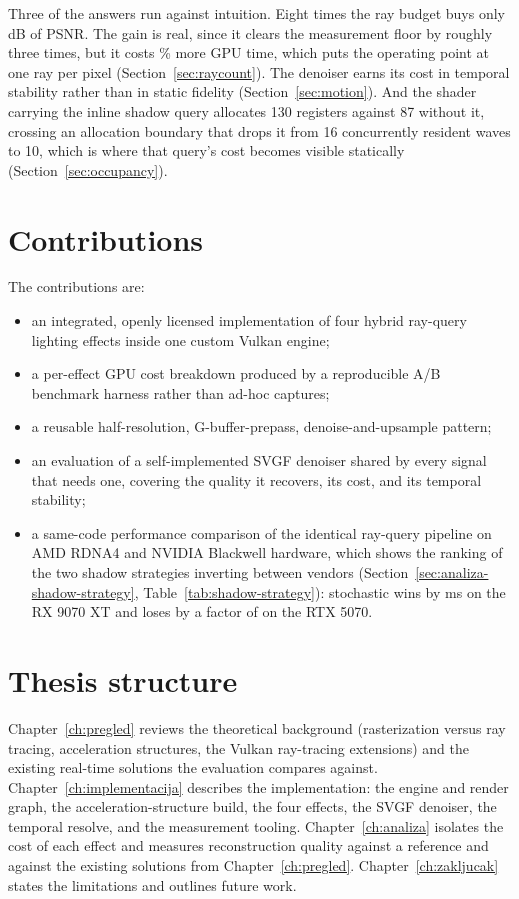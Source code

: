 Three of the answers run against intuition. Eight times the ray budget buys only \rcPsnrGain{} dB of
PSNR. The gain is real, since it clears the measurement floor by roughly three times, but it costs
\rcGpuPct\% more GPU time, which puts the operating point at one ray per pixel
(Section~\ref{sec:raycount}). The denoiser earns its cost in temporal stability rather than in static
fidelity (Section~\ref{sec:motion}). And the shader carrying the inline shadow query allocates 130
registers against 87 without it, crossing an allocation boundary that drops it from 16 concurrently
resident waves to 10, which is where that query's cost becomes visible statically
(Section~\ref{sec:occupancy}).

\section{Contributions}

The contributions are:

\begin{itemize}
\item an integrated, openly licensed implementation of four hybrid ray-query lighting effects inside
one custom Vulkan engine;
\item a per-effect GPU cost breakdown produced by a reproducible A/B benchmark harness rather than
ad-hoc captures;
\item a reusable half-resolution, G-buffer-prepass, denoise-and-upsample pattern;
\item an evaluation of a self-implemented SVGF denoiser shared by every signal that needs one, covering the
quality it recovers, its cost, and its temporal stability;
\item a same-code performance comparison of the identical ray-query pipeline on AMD RDNA4 and NVIDIA
Blackwell hardware, which shows the ranking of the two shadow strategies inverting between vendors
(Section~\ref{sec:analiza-shadow-strategy}, Table~\ref{tab:shadow-strategy}): stochastic wins by
\perfShadowGapAMD{} ms on the RX 9070 XT and loses by a factor of \perfShadowRatioNV{} on the
RTX 5070.
\end{itemize}

\section{Thesis structure}

Chapter~\ref{ch:pregled} reviews the theoretical background (rasterization versus ray tracing,
acceleration structures, the Vulkan ray-tracing extensions) and the existing real-time solutions the
evaluation compares against. Chapter~\ref{ch:implementacija} describes the implementation: the engine
and render graph, the acceleration-structure build, the four effects, the SVGF denoiser, the temporal
resolve, and the measurement tooling. Chapter~\ref{ch:analiza} isolates the cost of each effect and
measures reconstruction quality against a reference and against the existing solutions from
Chapter~\ref{ch:pregled}. Chapter~\ref{ch:zakljucak} states the limitations and outlines future work.
